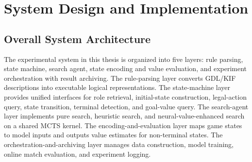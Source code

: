 

\chapter{System Design and Implementation}
\setcounter{figure}{0}
\setcounter{equation}{0}
\renewcommand{\thefigure}{\thechapter-\arabic{figure}}
\renewcommand{\theequation}{\thechapter-\arabic{equation}}


\section{Overall System Architecture}


The experimental system in this thesis is organized into five layers: rule parsing, state machine, search agent, state encoding and value evaluation, and experiment orchestration with result archiving. The rule-parsing layer converts GDL/KIF descriptions into executable logical representations. The state-machine layer provides unified interfaces for role retrieval, initial-state construction, legal-action query, state transition, terminal detection, and goal-value query. The search-agent layer implements pure search, heuristic search, and neural-value-enhanced search on a shared MCTS kernel. The encoding-and-evaluation layer maps game states to model inputs and outputs value estimates for non-terminal states. The orchestration-and-archiving layer manages data construction, model training, online match evaluation, and experiment logging.


